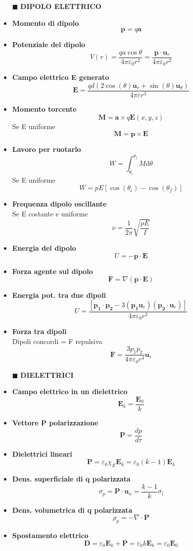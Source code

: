 \documentclass{book}
\newcommand{\g}{\textbf}
\newcommand{\h}{\mathbf}
\newcommand{\e}{\begin{equation}}
\newcommand{\ex}{\end{equation} }
\renewcommand{\it}{\item[$\cdot$]}
\begin{document}
\begin{multicols}{4}
\begin{itemize}
\hline
\item [$\blacksquare$] \g{DIPOLO ELETTRICO}
    \it \g{Momento di dipolo}
        \e{\h{p}=q \h{a}} \ex
    \it \g{Potenziale del dipolo}
        \e{V(r)=\frac{qa\cos{\theta}}{4\pi\varepsilon_0 r^2}=\frac{\h{p}\cdot\h{u}_r}{4\pi\varepsilon_0 r^2}} \ex
    \it \g{Campo elettrico \g{E} generato}
        \e{\mathbf{E}={\frac{q d\left(2\cos\left(\theta\right)\mathbf{u}_{r}+\sin\left(\theta\right)\mathbf{u}_{\theta}\right)}{4\pi\varepsilon r^{3}}}} \ex
    \it \g{Momento torcente}
        \e{\h{M}=\h{a}\times q\h{E}(x,y,z)} \ex
        Se E uniforme
        \e{\h{M}=\h{p}\times\h{E}} \ex
    \it \g{Lavoro per ruotarlo} 
        \e{W=\int_{\theta_{i}}^{\theta_{f}}M \mathrm{d}\theta} \ex
        Se E uniforme
        \e{W=p E[\cos(\theta_{i})-\cos(\theta_{f})]} \ex
    \it \g{Frequenza dipolo oscillante} \\
        Se E costante e uniforme
        \e{\nu=\frac{1}{2\pi}\sqrt{\frac{pE}{I}}} \ex
    \it \g{Energia del dipolo}
        \e{U=-\h{p}\cdot\h{E}} \ex
    \it \g{Forza agente sul dipolo}
        \e{\h{F}=\nabla(\h{p}\cdot\h{E})} \ex
    \it \g{Energia pot. tra due dipoli}
        \e{U=\frac{[\h{p_1}\cdot\h{p_2}-3(\h{p_1}\h{u}_r)(\h{p_2}\cdot\h{u}_r)]}{4\pi\varepsilon_0r^3}}\ex
    \it \g{Forza tra dipoli}\\
        Dipoli concordi = F repulsiva
        \e{\h{F}=\frac{3p_1p_2}{4\pi\varepsilon_0r^4}\h{u}_r}\ex

\hline
\item [$\blacksquare$] \g{DIELETTRICI}
    \it \g{Campo elettrico in un dielettrico}
        \e{\h{E}_k=\frac{\h{E}_0}{k}} \ex
    \it \g{Vettore P polarizzazione}
        \e{\h{P}=\frac{dp}{d\tau}} \ex
    \it \g{Dielettrici lineari}
        \e{\h{P}=\varepsilon_0\chi_E \h{E}_k=\varepsilon_0(k-1)\h{E}_k} \ex
    \it \g{Dens. superficiale di q polarizzata}
        \e{\sigma_p=\h{P}\cdot\h{u}_n=\frac{k-1}{k}\sigma_l} \ex
    \it \g{Dens. volumetrica di q polarizzata}
        \e{\rho_p=-\nabla\cdot\h{P}} \ex
    \it \g{Spostamento elettrico}
        \e{\h{D}=\varepsilon_0 \h{E}_k+\h{P}=\varepsilon_0 k \h{E}_k=\varepsilon_0 \h{E}_0} \ex


\end{itemize}
\end{multicols}
\end{document}
